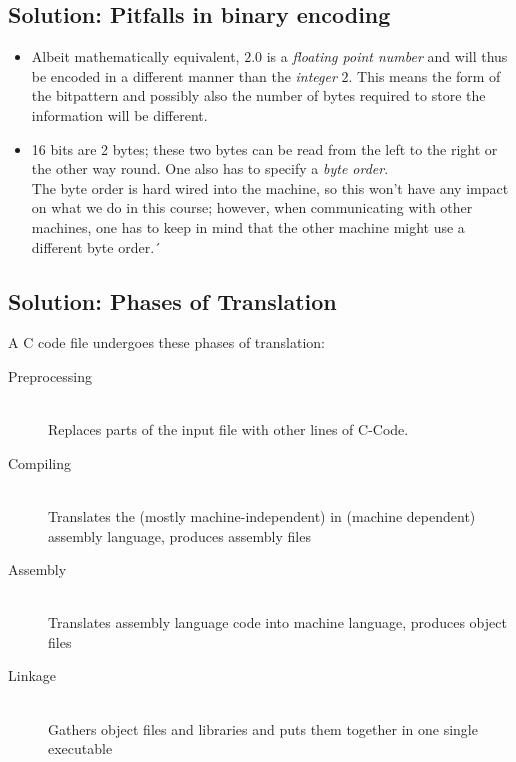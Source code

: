 \subsection*{Solution: Pitfalls in binary encoding}
\begin{itemize}
\item Albeit mathematically equivalent, $2.0$ is a \emph{floating point number} and will thus be encoded in a different manner than the \emph{integer} $2$.
	This means the form of the bitpattern and possibly also the number of bytes required to store the information will be different.
\item 16 bits are 2 bytes; these two bytes can be read from the left to the right or the other way round. One also has to specify a \emph{byte order}.\\
	The byte order is hard wired into the machine, so this won't have any impact on what we do in this course; however, when communicating with other machines,
	one has to keep in mind that the other machine might use a different byte order.´
\end{itemize}

\subsection*{Solution: Phases of Translation}
A C code file undergoes these phases of translation:
\begin{description}
\item[Preprocessing] \hfill \\
	Replaces parts of the input file with other lines of C-Code.
\item[Compiling]     \hfill \\
	Translates the (mostly machine-independent) in (machine dependent) assembly language, produces assembly files
\item[Assembly]      \hfill \\
	Translates assembly language code into machine language, produces object files
\item[Linkage]       \hfill \\
	Gathers object files and libraries and puts them together in one single executable
\end{description}


